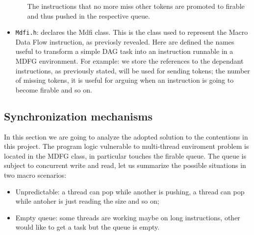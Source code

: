\documentclass[a4paper,11pt]{article}
\begin{document}
\begin{itemize}
\begin{itemize}
    The instructions that no more miss other tokens are promoted to firable and thus pushed in the respective queue.
  \end{itemize}
 \item \texttt{Mdfi.h}: declares the Mdfi class. This is the class used to represent the Macro Data Flow instruction, as previosly revealed. Here are defined the names useful to transform a simple
 DAG task into an instruction runnable in a MDFG environment. For example: we store the references to the dependant instructions, as previously stated, will be used for sending tokens; the number of missing tokens, it is useful for arguing when an instruction is going to become firable and so on.
 \end{itemize} 
\subsection{Synchronization mechanisms}
In this section we are going to analyze the adopted solution to the contentions in this project.
The program logic vulnerable to multi-thread enviroment problem is located in the MDFG class, in particular touches the firable queue.
The queue is subject to concurrent write and read, let us summarize the possible situations in two macro scenarios:
\begin{itemize}
  \item Unpredictable: a thread can pop while another is pushing, a thread can pop while antoher is just reading the size and so on;
  \item Empty queue: some threads are working maybe on long instructions, other would like to get a task but the queue is empty.  
\end{itemize}


\end{document}
